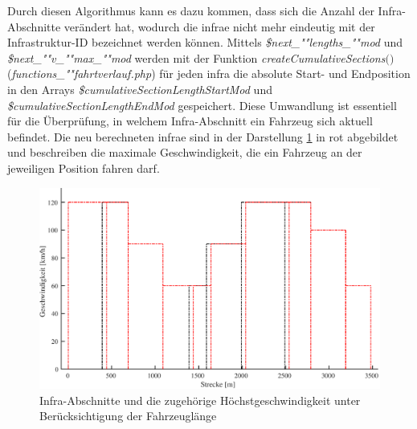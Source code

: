 Durch diesen Algorithmus kann es dazu kommen, dass sich die Anzahl der Infra-Abschnitte verändert hat, wodurch die \ac{infra}e nicht mehr eindeutig mit der Infrastruktur-ID bezeichnet werden können. Mittels \textit{\$next\_""lengths\_""mod} und \textit{\$next\_""v\_""max\_""mod} werden mit der Funktion \textit{create\-Cumulative\-Sec\-tions$($$)$} (\textit{func\-tions\_""fahrt\-ver\-lauf.php}) für jeden \ac{infra} die absolute Start- und Endposition in den Arrays \textit{\$cumulative\-Section\-Length\-Start\-Mod} und \textit{\$cumulativeSectionLengthEndMod} gespeichert. Diese Umwandlung ist essentiell für die Überprüfung, in welchem Infra-Abschnitt ein Fahrzeug sich aktuell befindet. Die neu berechneten \ac{infra}e sind in der Darstellung \ref{fig:it2} in rot abgebildet und beschreiben die maximale Geschwindigkeit, die ein Fahrzeug an der jeweiligen Position fahren darf.
\begin{figure}
\includegraphics[width=\linewidth]{../images/matlab/it2.pdf}
\caption{Infra-Abschnitte und die zugehörige Höchstgeschwindigkeit unter Berücksichtigung der Fahrzeuglänge}
\label{fig:it2}
\end{figure}
